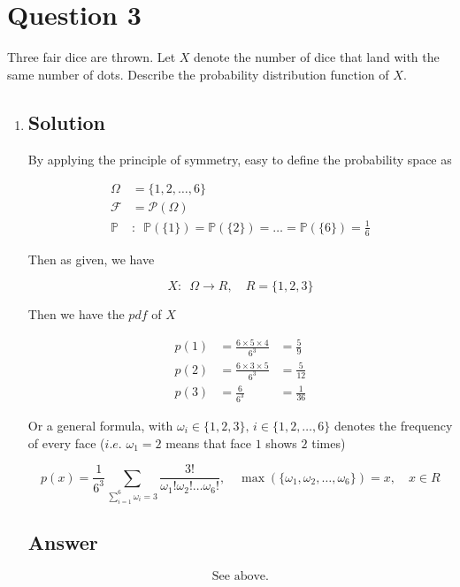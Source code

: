 \documentclass[12pt]{article}
\newcommand{\bP}{\mathbb{P}}
\begin{document}
	
	\section*{Question 3}
	
	\noindent Three fair dice are thrown. Let $X$ denote the number of dice that land with the same number of dots. Describe the probability distribution function of $X$.
	
	\bigskip
	
	\begin{enumerate}[label={},leftmargin=0in]\item
		\subsection*{Solution}
		
			By applying the principle of symmetry, easy to define the probability space as
			
			\[
			\begin{aligned}
				\Omega &= \{1,2,\dots,6\}\\
				\mathcal{F} &= \mathcal{P}(\Omega)\\
				\bP &:\enspace \bP(\{1\}) = \bP(\{2\}) = \dots = \bP(\{6\}) = \frac{1}{6}
			\end{aligned}
			\]
			
			Then as given, we have
			
			\[X:\enspace \Omega \rightarrow R,\quad R = \{1,2,3\}\]
			
			Then we have the $pdf$ of $X$
			
			\[
			\begin{aligned}
				p(1) &= \frac{6\times 5\times 4}{6^3} &= \frac{5}{9}\\
				p(2) &= \frac{6\times 3\times 5}{6^3} &= \frac{5}{12}\\
				p(3) &= \frac{6}{6^3} &= \frac{1}{36}
			\end{aligned}
			\]
			
			Or a general formula, with $\omega_i \in \{1,2,3\},\, i\in \{1,2,\dots,6\}$ denotes the frequency of every face ($i.e.$ $\omega_1 = 2$ means that face $1$ shows $2$ times)
			
			\[
				p(x) = \frac{1}{6^3}\sum_{\sum_{i=1}^6\omega_i=3}\frac{3!}{\omega_1!\omega_2!\dots \omega_6!},\quad \max(\{\omega_1,\omega_2,\dots,\omega_6\}) = x,\quad x\in R
			\]
		
		\subsection*{Answer}
		
			\[\boxed{\text{See above.}}\]
	\end{enumerate}
	
\end{document}
